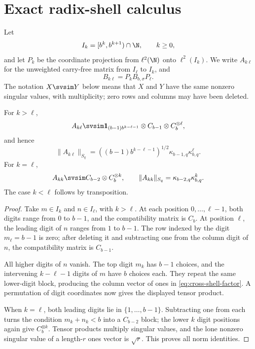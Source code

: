 \section{Exact radix-shell calculus}
\label{sec:shells}

Let
\[
  I_k=[b^k,b^{k+1})\cap\N,\qquad k\ge0,
\]
and let \(P_k\) be the coordinate projection from \(\ell^2(\N)\) onto
\(\ell^2(I_k)\).  We write \(A_{k\ell}\) for the unweighted carry-free
matrix from \(I_\ell\) to \(I_k\), and
\[
  B_{k\ell}=P_kB_{b,\sigma}P_\ell.
\]
The notation \(X\svsim Y\) below means that \(X\) and \(Y\) have the same
nonzero singular values, with multiplicity; zero rows and columns may have
been deleted.

\begin{proposition}
\label{prop:shell-blocks}
For \(k>\ell\),
\begin{equation}
  A_{k\ell}
  \svsim
  \mathbf 1_{(b-1)b^{k-\ell-1}}
  \otimes C_{b-1}\otimes C_b^{\otimes\ell},
  \label{eq:cross-shell-factor}
\end{equation}
and hence
\begin{equation}
  \|A_{k\ell}\|_{S_q}
  =
  ((b-1)b^{k-\ell-1})^{1/2}
  \kappa_{b-1,q}\kappa_{b,q}^{\ell}.
  \label{eq:cross-shell-norm}
\end{equation}
For \(k=\ell\),
\begin{equation}
  A_{kk}\svsim C_{b-2}\otimes C_b^{\otimes k},
  \qquad
  \|A_{kk}\|_{S_q}
  =\kappa_{b-2,q}\kappa_{b,q}^{k}.
  \label{eq:same-shell-factor}
\end{equation}
The case \(k<\ell\) follows by transposition.
\end{proposition}

\begin{proof}
Take \(m\in I_k\) and \(n\in I_\ell\), with \(k>\ell\).  At each position
\(0,\ldots,\ell-1\), both digits range from \(0\) to \(b-1\), and the
compatibility matrix is \(C_b\).  At position \(\ell\), the leading digit
of \(n\) ranges from \(1\) to \(b-1\).  The row indexed by the digit
\(m_\ell=b-1\) is zero; after deleting it and subtracting one from the
column digit of \(n\), the compatibility matrix is \(C_{b-1}\).

All higher digits of \(n\) vanish.  The top digit \(m_k\) has \(b-1\)
choices, and the intervening \(k-\ell-1\) digits of \(m\) have \(b\)
choices each.  They repeat the same lower-digit block, producing the
column vector of ones in \cref{eq:cross-shell-factor}.  A permutation of
digit coordinates now gives the displayed tensor product.

When \(k=\ell\), both leading digits lie in
\(\{1,\ldots,b-1\}\).  Subtracting one from each turns the condition
\(m_k+n_k<b\) into a \(C_{b-2}\) block; the lower \(k\) digit positions
again give \(C_b^{\otimes k}\).  Tensor products multiply singular values,
and the lone nonzero singular value of a length-\(r\) ones vector is
\(\sqrt r\).  This proves all norm identities.
\end{proof}

